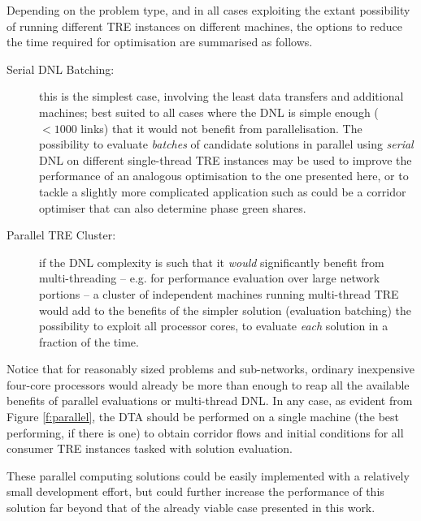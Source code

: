 Depending on the problem type, and in all cases exploiting the extant possibility of running different TRE instances on different machines, the options to reduce the time required for optimisation are summarised as follows.
\begin{description}
\item[Serial DNL Batching:] this is the simplest case, involving the least data transfers and additional machines; best suited to all cases where the DNL is simple enough ($ < 1000$ links) that it would not benefit from parallelisation. The possibility to evaluate \emph{batches} of candidate solutions in parallel using \emph{serial} DNL on different single-thread TRE instances may be used to improve the performance of an analogous optimisation to the one presented here, or to tackle a slightly more complicated application such as could be a corridor optimiser that can also determine phase green shares.
\item[Parallel TRE Cluster:]  if the DNL complexity is such that it \emph{would} significantly benefit from multi-threading \--- e.g. for performance evaluation over large network portions \--- a cluster of independent machines running multi-thread TRE would add to the benefits of the simpler solution (evaluation batching) the possibility to exploit all processor cores, to evaluate \emph{each} solution in a fraction of the time.
\end{description}
Notice that for reasonably sized problems and sub-networks, ordinary inexpensive four-core processors would already be more than enough to reap all the available benefits of parallel evaluations or multi-thread DNL. In any case, as evident from Figure \ref{f:parallel}, the DTA should be performed on a single machine (the best performing, if there is one) to obtain corridor flows and initial conditions for all consumer TRE instances tasked with solution evaluation. 

These parallel computing solutions could be easily implemented with a relatively small development effort, but could further increase the performance of this solution far beyond that of the already viable case presented in this work.
